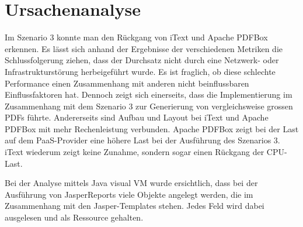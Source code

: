 \documentclass[main.tex]{subfiles}
\begin{document}
\section{Ursachenanalyse}


Im Szenario 3 konnte man den Rückgang von iText und Apache PDFBox erkennen. Es lässt sich anhand der Ergebnisse der verschiedenen Metriken die Schlussfolgerung ziehen, dass der Durchsatz nicht durch eine Netzwerk- oder Infrastrukturstörung herbeigeführt wurde. Es ist fraglich, ob diese schlechte Performance einen Zusammenhang mit anderen nicht beinflussbaren Einflussfaktoren hat. Dennoch zeigt sich einerseits, dass die Implementierung im Zusammenhang mit dem Szenario 3 zur Generierung von vergleichsweise grossen PDFs führte. Andererseits sind Aufbau und Layout bei iText und Apache PDFBox mit mehr Rechenleistung verbunden. Apache PDFBox zeigt bei der Last auf dem PaaS-Provider eine höhere Last bei der Ausführung des Szenarios 3. iText wiederum zeigt keine Zunahme, sondern sogar einen Rückgang der CPU-Last.

Bei der Analyse mittels Java visual VM wurde ersichtlich, dass bei der Ausführung von JasperReports viele Objekte angelegt werden, die im Zusammenhang mit den Jasper-Templates stehen. Jedes Feld wird dabei ausgelesen und als Ressource gehalten.
\end{document}
